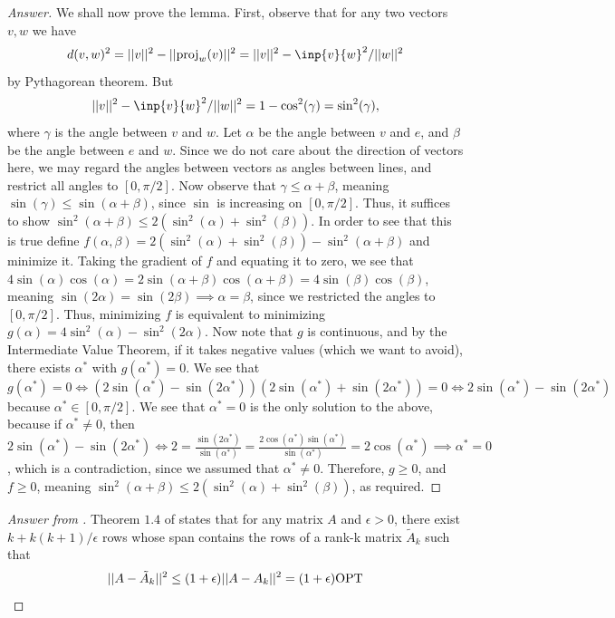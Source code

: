 \documentclass{article}
\begin{document}
\begin{proof}[Answer]
We shall now prove the lemma. First, observe that for any two vectors $v,w$ we have $$d(v,w)^2 = \norm{v}^2 - \norm{\proj_w(v)}^2 = \norm{v}^2 - \inp{v}{w}^2/\norm{w}^2$$ by Pythagorean theorem. But $$\norm{v}^2 - \inp{v}{w}^2/\norm{w}^2 = 1 - \cos^2(\gamma) = \sin^2(\gamma),$$ where $\gamma$ is the angle between $v$ and $w$. Let $\alpha$ be the angle between $v$ and $e$, and $\beta$ be the angle between $e$ and $w$. Since we do not care about the direction of vectors here, we may regard the angles between vectors as angles between lines, and restrict all angles to $[0,\pi/2]$. Now observe that $\gamma \leq \alpha + \beta$, meaning $\sin(\gamma)\leq \sin(\alpha+\beta)$, since $\sin$ is increasing on $[0,\pi/2]$. Thus, it suffices to show $\sin^2(\alpha+\beta) \leq 2(\sin^2(\alpha)+\sin^2(\beta))$. In order to see that this is true define $f(\alpha,\beta) = 2(\sin^2(\alpha)+\sin^2(\beta))-\sin^2(\alpha+\beta)$ and minimize it. Taking the gradient of $f$ and equating it to zero, we see that $4\sin(\alpha)\cos(\alpha)=2\sin(\alpha+\beta)\cos(\alpha+\beta) = 4\sin(\beta)\cos(\beta)$, meaning $\sin(2\alpha)=\sin(2\beta)\implies \alpha = \beta$, since we restricted the angles to $[0,\pi/2]$. Thus, minimizing $f$ is equivalent to minimizing $g(\alpha) = 4\sin^2(\alpha)-\sin^2(2\alpha)$. Now note that $g$ is continuous, and by the Intermediate Value Theorem, if it takes negative values (which we want to avoid), there exists $\alpha^*$ with $g(\alpha^*) = 0$. We see that $$g(\alpha^*)=0\iff (2\sin(\alpha^*)-\sin(2\alpha^*))(2\sin(\alpha^*)+\sin(2\alpha^*))=0 \iff 2\sin(\alpha^*)-\sin(2\alpha^*)$$ because $\alpha^*\in [0,\pi/2]$. We see that $\alpha^*=0$ is the only solution to the above, because if $\alpha^*\neq 0$, then $2\sin(\alpha^*)-\sin(2\alpha^*)\iff 2 = \frac{\sin(2\alpha^*)}{\sin(\alpha^*)} = \frac{2\cos(\alpha^*)\sin(\alpha^*)}{\sin(\alpha^*)} = 2\cos(\alpha^*)\implies \alpha^* = 0$, which is a contradiction, since we assumed that $\alpha^* \neq 0$. Therefore, $g\geq0$, and $f\geq 0$, meaning $\sin^2(\alpha+\beta)\leq 2(\sin^2(\alpha)+\sin^2(\beta))$, as required.
\end{proof}

\begin{proof}[Answer from \cite{deshpande2006matrix}]
Theorem $1.4$ of \cite{deshpande2006matrix} states that for any matrix $A$ and $\epsilon>0$, there exist $k+k(k +1)/\epsilon$ rows whose span contains the rows of
a rank-k matrix $\tilde{A}_k$ such that
$$||A - \tilde{A}_k||^2 \leq (1+\epsilon)||A - A_k||^2 = (1+\epsilon)\text{OPT}$$
\end{proof}
\end{document}
